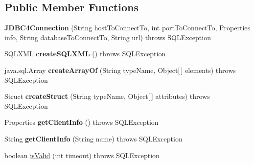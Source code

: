 \subsection*{Public Member Functions}
\begin{DoxyCompactItemize}
\item 
\mbox{\label{classcom_1_1mysql_1_1jdbc_1_1_j_d_b_c4_connection_acd14dd4904a72113129b38bd80ac8bc8}} 
{\bfseries J\+D\+B\+C4\+Connection} (String host\+To\+Connect\+To, int port\+To\+Connect\+To, Properties info, String database\+To\+Connect\+To, String url)  throws S\+Q\+L\+Exception 
\item 
\mbox{\label{classcom_1_1mysql_1_1jdbc_1_1_j_d_b_c4_connection_ae971a811895ff94f8b5cedbf63c5b487}} 
S\+Q\+L\+X\+ML {\bfseries create\+S\+Q\+L\+X\+ML} ()  throws S\+Q\+L\+Exception 
\item 
\mbox{\label{classcom_1_1mysql_1_1jdbc_1_1_j_d_b_c4_connection_a2b081c250ab62215b4660304a049c7d6}} 
java.\+sql.\+Array {\bfseries create\+Array\+Of} (String type\+Name, Object\mbox{[}$\,$\mbox{]} elements)  throws S\+Q\+L\+Exception 
\item 
\mbox{\label{classcom_1_1mysql_1_1jdbc_1_1_j_d_b_c4_connection_a4e5fbe388f206b0fe46b1d7f691fa1db}} 
Struct {\bfseries create\+Struct} (String type\+Name, Object\mbox{[}$\,$\mbox{]} attributes)  throws S\+Q\+L\+Exception 
\item 
\mbox{\label{classcom_1_1mysql_1_1jdbc_1_1_j_d_b_c4_connection_aef1ad7c06224a39aaa64b92d415d1c08}} 
Properties {\bfseries get\+Client\+Info} ()  throws S\+Q\+L\+Exception 
\item 
\mbox{\label{classcom_1_1mysql_1_1jdbc_1_1_j_d_b_c4_connection_a1039de8083fed69e72d92e5d4742c3d0}} 
String {\bfseries get\+Client\+Info} (String name)  throws S\+Q\+L\+Exception 
\item 
boolean \mbox{\hyperlink{classcom_1_1mysql_1_1jdbc_1_1_j_d_b_c4_connection_a983196178af2e710098d18e8f1b661d8}{is\+Valid}} (int timeout)  throws S\+Q\+L\+Exception 

\end{DoxyCompactItemize}
